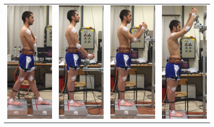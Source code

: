 \begin{figure}
\begin{tabular}{c}
  \end{tabular}
  \centering
  \begin{tabular}{cccc}
    \includegraphics[width=0.2\columnwidth]{Morteza/figs/widestance.jpg} &
    \includegraphics[width=0.2\columnwidth]{Morteza/figs/low.jpg} &
    \includegraphics[width=0.2\columnwidth]{Morteza/figs/mid.jpg} &
    \includegraphics[width=0.2\columnwidth]{Morteza/figs/high.jpg} \\

\end{tabular}
\end{figure}
